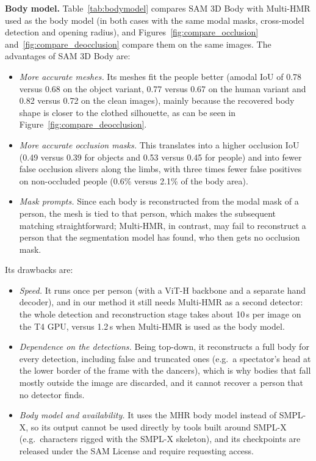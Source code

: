 \documentclass[11pt,a4paper]{article}
\begin{document}
\textbf{Body model.} Table~\ref{tab:bodymodel} compares SAM 3D Body with Multi-HMR used as the body model (in both cases with the same modal masks, cross-model detection and opening radius), and Figures~\ref{fig:compare_occlusion} and~\ref{fig:compare_deocclusion} compare them on the same images. The advantages of SAM 3D Body are:
\begin{itemize}
  \item \emph{More accurate meshes.} Its meshes fit the people better (amodal IoU of 0.78 versus 0.68 on the object variant, 0.77 versus 0.67 on the human variant and 0.82 versus 0.72 on the clean images), mainly because the recovered body shape is closer to the clothed silhouette, as can be seen in Figure~\ref{fig:compare_deocclusion}.
  \item \emph{More accurate occlusion masks.} This translates into a higher occlusion IoU (0.49 versus 0.39 for objects and 0.53 versus 0.45 for people) and into fewer false occlusion slivers along the limbs, with three times fewer false positives on non-occluded people (0.6\% versus 2.1\% of the body area).
  \item \emph{Mask prompts.} Since each body is reconstructed from the modal mask of a person, the mesh is tied to that person, which makes the subsequent matching straightforward; Multi-HMR, in contrast, may fail to reconstruct a person that the segmentation model has found, who then gets no occlusion mask.
\end{itemize}
Its drawbacks are:
\begin{itemize}
  \item \emph{Speed.} It runs once per person (with a ViT-H backbone and a separate hand decoder), and in our method it still needs Multi-HMR as a second detector: the whole detection and reconstruction stage takes about 10\,s per image on the T4 GPU, versus 1.2\,s when Multi-HMR is used as the body model.
  \item \emph{Dependence on the detections.} Being top-down, it reconstructs a full body for every detection, including false and truncated ones (e.g.\ a spectator's head at the lower border of the frame with the dancers), which is why bodies that fall mostly outside the image are discarded, and it cannot recover a person that no detector finds.
  \item \emph{Body model and availability.} It uses the MHR body model instead of SMPL-X, so its output cannot be used directly by tools built around SMPL-X (e.g.\ characters rigged with the SMPL-X skeleton), and its checkpoints are released under the SAM License and require requesting access.
\end{itemize}
\end{document}
